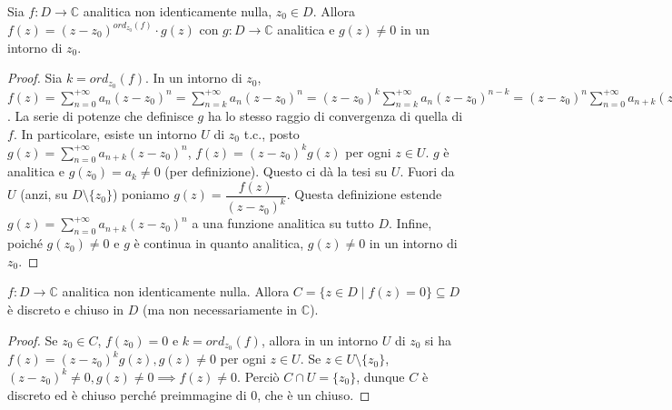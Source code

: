 \begin{prop}
  Sia $f:D \longrightarrow \mathbb{C}$ analitica non identicamente nulla, $z_0 \in D$. Allora $f(z)=(z-z_0)^{ord_{z_0}(f)}\cdot g(z)$ con $g:D \longrightarrow \mathbb{C}$ analitica e $g(z)\not=0$ in un intorno di $z_0$.
\end{prop}

\begin{proof}
  Sia $k=ord_{z_0}(f)$. In un intorno di $z_0$, $\displaystyle f(z)=\sum_{n=0}^{+\infty} a_n(z-z_0)^n=\sum_{n=k}^{+\infty} a_n(z-z_0)^n=(z-z_0)^k\sum_{n=k}^{+\infty} a_n(z-z_0)^{n-k}=(z-z_0)^n\sum_{n=0}^{+\infty} a_{n+k}(z-z_0)^n=(z-z_0)^kg(z)$. La serie di potenze che definisce $g$ ha lo stesso raggio di convergenza di quella di $f$.
  In particolare, esiste un intorno $U$ di $z_0$ t.c., posto $\displaystyle g(z)=\sum_{n=0}^{+\infty} a_{n+k}(z-z_0)^n$, $f(z)=(z-z_0)^kg(z)$ per ogni $z \in U$. $g$ è analitica e $g(z_0)=a_k \not=0$ (per definizione). Questo ci dà la tesi su $U$. Fuori da $U$ (anzi, su $D \setminus \{z_0\}$) poniamo $g(z)=\dfrac{f(z)}{(z-z_0)^k}$.
  Questa definizione estende $\displaystyle g(z)=\sum_{n=0}^{+\infty} a_{n+k}(z-z_0)^n$ a una funzione analitica su tutto $D$. Infine, poiché $g(z_0)\not=0$ e $g$ è continua in quanto analitica, $g(z)\not=0$ in un intorno di $z_0$.
\end{proof}

\begin{cor}
  $f:D \longrightarrow \mathbb{C}$ analitica non identicamente nulla.  Allora $C=\{z \in D \mid f(z)=0\} \subseteq D$ è discreto e chiuso in $D$ (ma non necessariamente in $\mathbb{C}$).
\end{cor}

\begin{proof}
  Se $z_0 \in C$, $f(z_0)=0$ e $k=ord_{z_0}(f)$, allora in un intorno $U$ di $z_0$ si ha $f(z)=(z-z_0)^kg(z), g(z) \not=0$ per ogni $z \in U$. Se $z \in U \setminus \{z_0\}$, $(z-z_0)^k\not=0, g(z) \not=0 \implies f(z) \not=0$.
  Perciò $C \cap U=\{z_0\}$, dunque $C$ è discreto ed è chiuso perché preimmagine di $0$, che è un chiuso.
\end{proof}
